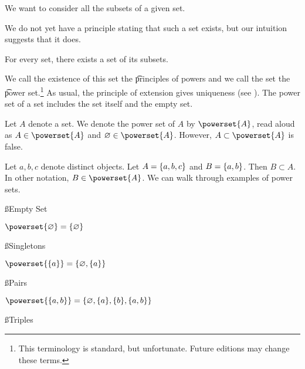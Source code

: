 

We want to consider all the subsets of a given set.


We do not yet have a principle stating that such a set exists, but our intuition suggests that it does.

\begin{principle}[Powers]
  For every set, there exists a set of its subsets.
\end{principle}

We call the existence of this set the \t{principles of powers} and we call the set the \t{power set}.\footnote{This terminology is standard, but unfortunate. Future editions may change these terms.}
As usual, the principle of extension gives uniqueness (see ).
The power set of a set includes the set itself and the empty set.


Let $A$ denote a set.
We denote the power set of $A$ by $\powerset{A}$, read aloud as 
$A \in \powerset{A}$ and $\emptyset \in \powerset{A}$.
However, $A \subset \powerset{A}$ is false.


Let $a, b, c$ denote distinct objects. Let $A = \{a, b ,c\}$
and $B = \{a, b\}$. Then
$B \subset A$.
In other notation,
$B \in \powerset{A}$.
We can walk through examples of power sets.

\ss{Empty Set}

\begin{proposition}
  $\powerset{\emptyset} = \set{\emptyset}$
\end{proposition}

\ss{Singletons}

\begin{proposition}
  $\powerset{\set{a}} = \set{\emptyset, \set{a}}$
\end{proposition}

\ss{Pairs}

\begin{proposition}
  $\powerset{\set{a, b}} = \set{\emptyset, \set{a}, \set{b}, \set{a, b}}$
\end{proposition}

\ss{Triples}

